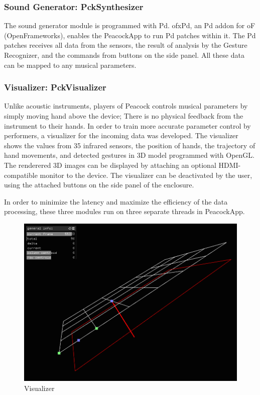\documentclass{nime-alternate}
\begin{document}
\subsubsection{Sound Generator: PckSynthesizer}

The sound generator module is programmed with Pd\cite{Pd}. ofxPd\cite{ofxPd}, an Pd addon for oF\\(OpenFrameworks), enables the PeacockApp to run Pd patches within it. The Pd patches receives all data from the sensors, the result of analysis by the Gesture Recognizer, and the commands from buttons on the side panel. All these data can be mapped to any musical parameters.
 
\subsubsection{Visualizer: PckVisualizer}

Unlike acoustic instruments, players of Peacock controls musical parameters by simply moving hand above the device; There is no physical feedback from the instrument to their hands. In order to train more accurate parameter control by performers, a visualizer for the incoming data was developed.  The visualizer shows the values from 35 infrared sensors, the position of hands, the trajectory of hand movements, and detected gestures in  3D model programmed with OpenGL\cite{OpenGL}. The renderered 3D images can be displayed by attaching an optional HDMI-compatible monitor to the device.
The visualizer can be deactivated by the user, using the attached buttons on the side panel of the enclosure.

In order to minimize the latency and maximize the efficiency of the data processing, these three modules run on three separate threads in PeacockApp. 

\begin{figure}[htbp]
       \begin{center}
              \includegraphics[scale=0.3]{visualizer.png}
       \end{center}
       \caption{Visualizer}
       \label{fig:visualizer}
\end{figure}
\end{document}
